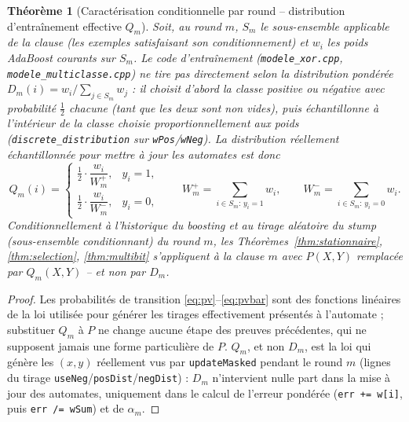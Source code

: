 \documentclass[12pt,a4paper]{article}
\newtheorem{theorem}{Théorème}[section]
\theoremstyle{remark}
\begin{document}
\begin{theorem}[Caractérisation conditionnelle par round -- distribution d'entraînement effective $Q_m$]\label{thm:boosting}
Soit, au round $m$, $S_m$ le sous-ensemble applicable de la clause (les
exemples satisfaisant son conditionnement) et $w_i$ les poids AdaBoost
courants sur $S_m$. Le code d'entraînement
(\texttt{modele\_xor.cpp}, \texttt{modele\_multiclasse.cpp}) ne tire
\emph{pas} directement selon la distribution pondérée
$D_m(i)=w_i/\sum_{j\in S_m}w_j$ : il choisit d'abord la classe positive ou
négative avec probabilité $\tfrac12$ chacune (tant que les deux sont non
vides), puis échantillonne \emph{à l'intérieur} de la classe choisie
proportionnellement aux poids (\texttt{discrete\_distribution} sur
\texttt{wPos}/\texttt{wNeg}). La distribution réellement échantillonnée pour
mettre à jour les automates est donc
\[
  Q_m(i) = \begin{cases}
    \tfrac12\cdot\dfrac{w_i}{W_m^+}, & y_i=1,\\[2mm]
    \tfrac12\cdot\dfrac{w_i}{W_m^-}, & y_i=0,
  \end{cases}
  \qquad
  W_m^+=\!\!\sum_{i\in S_m:\,y_i=1}\!\! w_i,\qquad
  W_m^-=\!\!\sum_{i\in S_m:\,y_i=0}\!\! w_i.
\]
Conditionnellement à l'historique du boosting et au tirage aléatoire du stump
(sous-ensemble conditionnant) du round $m$, les
Théorèmes~\ref{thm:stationnaire}, \ref{thm:selection}, \ref{thm:multibit}
s'appliquent à la clause $m$ avec $P(X,Y)$ remplacée par $Q_m(X,Y)$ --
\emph{et non} par $D_m$.
\end{theorem}

\begin{proof}
Les probabilités de transition \eqref{eq:pv}--\eqref{eq:pvbar} sont des
fonctions linéaires de la loi utilisée pour générer les tirages effectivement
présentés à l'automate ; substituer $Q_m$ à $P$ ne change aucune étape des
preuves précédentes, qui ne supposent jamais une forme particulière de $P$.
$Q_m$, et non $D_m$, est la loi qui génère les $(x,y)$ réellement vus par
\texttt{updateMasked} pendant le round $m$ (lignes du tirage
\texttt{useNeg}/\texttt{posDist}/\texttt{negDist}) : $D_m$ n'intervient nulle
part dans la mise à jour des automates, uniquement dans le calcul de l'erreur
pondérée (\texttt{err += w[i]}, puis \texttt{err /= wSum}) et de $\alpha_m$.
\end{proof}
\end{document}
